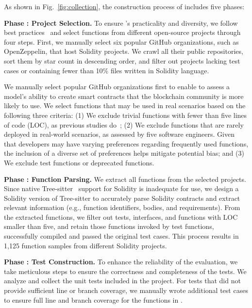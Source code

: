 As shown in Fig.~\ref{fig:collection}, the construction process of \datasetname includes five phases:


\textbf{Phase : Project Selection.}
To ensure \datasetname's practicality and diversity, we follow best practices~\cite{chen2021evaluating,yu2024codereval,liu2024your} and select functions from different open-source projects through four steps. 
First, we manually select six popular GitHub organizations, such as OpenZeppelin, that host Solidity projects.
We crawl all their public repositories, sort them by star count in descending order, and filter out projects lacking test cases or containing fewer than 10\% files written in Solidity language.


We manually select popular GitHub organizations first to enable \datasetname to assess a model’s ability to create smart contracts that the blockchain community is more likely to use. 
We select functions that may be used in real scenarios based on the following three criteria: 
(1) We exclude trivial functions with fewer than five lines of code (LOC), as previous studies do~\cite{tse24gassmell}; 
(2) We exclude functions that are rarely deployed in real-world scenarios, as assessed by five software engineers. 
Given that developers may have varying preferences regarding frequently used functions, the inclusion of a diverse set of preferences helps mitigate potential bias; 
and (3) We exclude test functions or deprecated functions.


\textbf{Phase : Function Parsing.}
We extract all functions from the selected projects.
Since native Tree-sitter~\cite{treesitter} support for Solidity is inadequate for use, we design a Solidity version of Tree-sitter to accurately parse Solidity contracts and extract relevant information (e.g., function identifiers, bodies, and requirements).
From the extracted functions, we filter out tests, interfaces, and functions with LOC smaller than five, and retain those functions invoked by test functions, successfully compiled and passed the original test cases.
This process results in 1,125 function samples from different Solidity projects.


\textbf{Phase : Test Construction.}
To enhance the reliability of the evaluation, we take meticulous steps to ensure the correctness and completeness of the tests.
We analyze and collect the unit tests included in the project. 
For tests that did not provide sufficient line or branch coverage, we manually wrote additional test cases to ensure full line and branch coverage for the functions in \datasetname.


